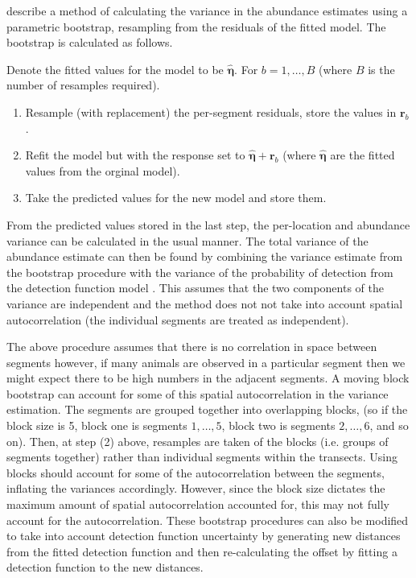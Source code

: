 \documentclass[a4paper,12pt]{article}
\begin{document}
\cite{Hedley:2004et} describe a method of calculating the variance in the abundance estimates using a parametric bootstrap, resampling from the residuals of the fitted model. The bootstrap is calculated as follows.

Denote the fitted values for the model to be $\hat{\bm{\eta}}$. For $b=1,\ldots,B$ (where $B$ is the number of resamples required).
\begin{enumerate}
	\item Resample (with replacement) the per-segment residuals, store the values in $\mathbf{r}_{b}$.
	\item Refit the model but with the response set to $\hat{\bm{\eta}}+\mathbf{r}_{b}$ (where $\hat{\bm{\eta}}$ are the fitted values from the orginal model).
	\item Take the predicted values for the new model and store them.
\end{enumerate}
From the predicted values stored in the last step, the per-location and abundance variance can be calculated in the usual manner. The total variance of the abundance estimate can then be found by combining the variance estimate from the bootstrap procedure with the variance of the probability of detection from the detection function model \citep[using the delta method;][]{Seber:2002ti}. This assumes that the two components of the variance are independent and the method does not not take into account spatial autocorrelation (the individual segments are treated as independent).

The above procedure assumes that there is no correlation in space between segments however, if many animals are observed in a particular segment then we might expect there to be high numbers in the adjacent segments. A moving block bootstrap \citep[MBB;][Section 8.6]{Efron:1993tv} can account for some of this spatial autocorrelation in the variance estimation. The segments are grouped together into overlapping blocks, (so if the block size is 5, block one is segments $1,\ldots,5$, block two is segments $2,\ldots,6$, and so on). Then, at step (2) above, resamples are taken of the blocks (i.e. groups of segments together) rather than individual segments within the transects. Using blocks should account for some of the autocorrelation between the segments, inflating the variances accordingly. However, since the block size dictates the maximum amount of spatial autocorrelation accounted for, this may not fully account for the autocorrelation. These bootstrap procedures can also be modified to take into account detection function uncertainty by generating new distances from the fitted detection function and then re-calculating the offset by fitting a detection function to the new distances.
 
\end{document}
